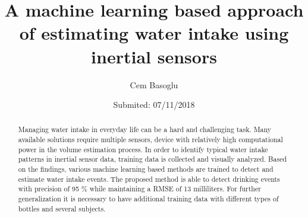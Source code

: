 \documentclass[twocolumn,fleqn,runningheads]{template/svjour2}[23.12.1232]
\begin{document}
\title{A machine learning based approach of estimating water intake using inertial sensors}

\author{Cem Basoglu}


\date{Submited: 07/11/2018}

\maketitle

\begin{abstract}
Managing water intake in everyday life can be a hard and challenging task. Many available solutions require multiple sensors, device with relatively high computational power in the volume estimation process.  In order to identify typical water intake patterns in inertial sensor data, training data is collected and visually analyzed. Based on the findings, various machine learning based methods are trained to detect and estimate water intake events. The proposed method is able to detect drinking events with precision of 95 \% while maintaining a RMSE of 13 milliliters. For further generalization it is necessary to have additional training data with different types of bottles and several subjects.
\end{abstract}









\end{document}
